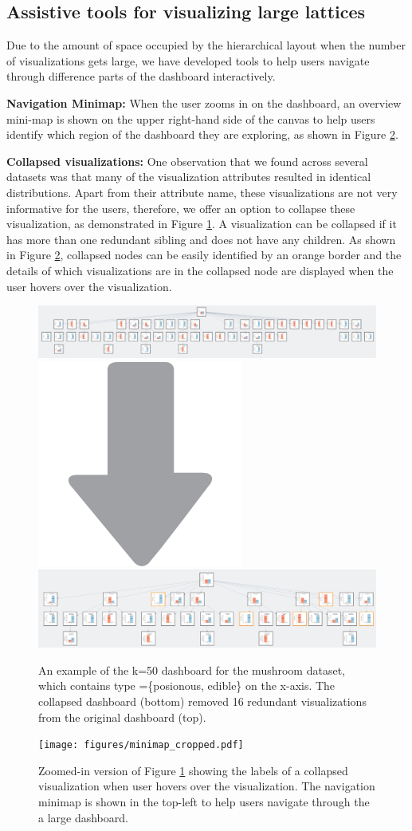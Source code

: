 \subsection{Assistive tools for visualizing large lattices}
Due to the amount of space occupied by the hierarchical layout when the number of visualizations gets large, we have developed tools to help users navigate through difference parts of the dashboard interactively. 
\par \textbf{Navigation Minimap:}  When the user zooms in on the dashboard, an overview mini-map is shown on the upper right-hand side of the canvas to help users identify which region of the dashboard they are exploring, as shown in Figure \ref{hover_minimap}. 
\par \textbf{Collapsed visualizations:} 
One observation that we found across several datasets was that many of the visualization attributes resulted in identical distributions. Apart from their attribute name, these visualizations are not very informative for the users, therefore, we offer an option to collapse these visualization, as demonstrated in Figure \ref{collapse_demo}. A visualization can be collapsed if it has more than one redundant sibling and does not have any children. As shown in Figure \ref{hover_minimap}, collapsed nodes can be easily identified by an orange border and the details of which visualizations are in the collapsed node are displayed when the user hovers over the visualization.
\begin{figure}[ht!]
\label{collapse_demo}
\centering
\includegraphics[width=\linewidth]{figures/k50_original.jpeg}
\includegraphics[width=0.05\linewidth]{figures/arrow_down.png}
\includegraphics[width=\linewidth]{figures/k50_collapsed.jpeg}
\caption{An example of the k=50 dashboard for the mushroom dataset, which contains type =\{posionous, edible\} on the x-axis. The collapsed dashboard (bottom) removed 16 redundant visualizations from the original dashboard (top).}
\end{figure}

\begin{figure}[ht!]
\label{hover_minimap}
\centering
\texttt{[image: figures/minimap\_cropped.pdf]}
\caption{Zoomed-in version of Figure \ref{collapse_demo} showing the labels of a collapsed visualization when user hovers over the visualization. The navigation minimap is shown in the top-left to help users navigate through the a large dashboard.}
\end{figure}
